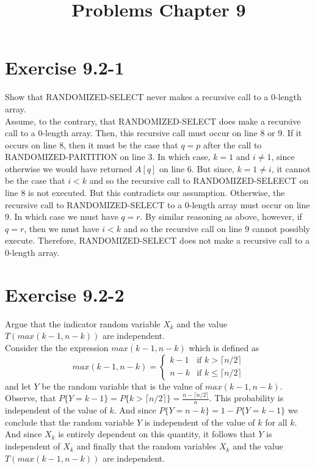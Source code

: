\documentclass[10pt,a4paper]{article}
\title{Problems Chapter 9}
\date{}
\begin{document}
\maketitle
\section*{Exercise 9.2-1}
Show that RANDOMIZED-SELECT never makes a recursive call to a 0-length array.
\vspace*{\baselineskip}
\\
Assume, to the contrary, that RANDOMIZED-SELECT does make a recursive call to a 0-length array. Then, this recursive call must occur on line 8 or 9. If it occurs on line 8, then it must be the case that $q=p$ after the call to RANDOMIZED-PARTITION on line 3. In which case, $k=1$ and $i\neq 1$, since otherwise we would have returned $A[q]$ on line 6. But since, $k=1\neq i$, it cannot be the case that $i<k$ and so the recursive call to RANDOMIZED-SELEECT on line 8 is not executed. But this contradicts our assumption. Otherwise, the recursive call to RANDOMIZED-SELECT to a 0-length array must occur on line 9. In which case we must have $q=r$. By similar reasoning as above, however, if $q=r$, then we must have $i<k$ and so the recursive call on line 9 cannot possibly execute. Therefore, RANDOMIZED-SELECT does not make a recursive call to a 0-length array.

\section*{Exercise 9.2-2}
Argue that the indicator random variable $X_k$ and the value $T(\textit{max}(k-1,n-k))$ are independent.
\vspace*{\baselineskip}
\\
Consider the the expression $\textit{max}(k-1, n-k)$ which is defined as
\begin{equation}
\textit{max}(k-1,n-k)=\begin{cases}
	k-1 & \text{if } k > \lceil n/2\rceil\\
	n-k & \text{if } k \leq \lceil n/2\rceil
	\end{cases}
\end{equation}
and let $Y$ be the random variable that is the value of $\textit{max}(k-1,n-k)$. Observe, that $P\lbrace Y=k-1\rbrace = P\lbrace k > \lceil n/2 \rceil\rbrace = \frac{n-\lceil n/2\rceil}{n}$. This probability is independent of the value of $k$. And since $P\lbrace Y=n-k\rbrace = 1 - P\lbrace Y=k-1\rbrace$ we conclude that the random variable $Y$ is independent of the value of $k$ for all $k$. And since $X_k$ is entirely dependent on this quantity, it follows that $Y$ is independent of $X_k$ and finally that the random variables $X_k$ and the value $T(\textit{max}(k-1,n-k))$ are independent.
\end{document}
